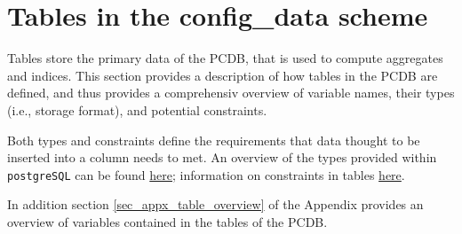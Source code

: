 \section{Tables in the config\_data scheme}\label{sec_tables}
Tables store the primary data of the PCDB, that is used to compute aggregates and indices.
This section provides a description of how tables in the PCDB are defined, and thus provides a comprehensiv overview of variable names, their types (i.e., storage format), and potential constraints.

Both types and constraints define the requirements that data thought to be inserted into a column needs to met. An overview of the types provided within \texttt{\footnotesize postgreSQL} can be found \href{http://www.postgresql.org/docs/9.3/static/datatype.html}{here}; information on constraints in tables \href{http://www.postgresql.org/docs/9.3/static/ddl-constraints.html}{here}.

In addition section \ref{sec_appx_table_overview} of the Appendix provides an overview of variables contained in the tables of the PCDB.


		
		
		
		
		
		
		
		
	
		
		
		

		
		
		
		
		
		
		
		